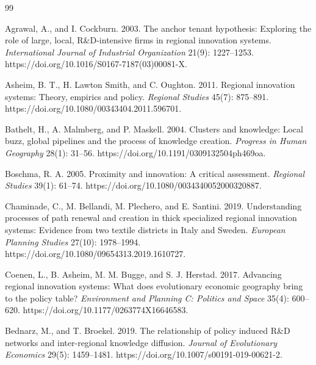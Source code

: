\begin{thebibliography}{99}
\providecommand{\natexlab}[1]{#1}
\providecommand{\url}[1]{\texttt{#1}}
\providecommand{\doi}[1]{https://doi.org/#1}

Agrawal, A., and I. Cockburn. 2003. The anchor tenant hypothesis: Exploring the role of large, local, R\&D-intensive firms in regional innovation systems. \emph{International Journal of Industrial Organization} 21(9): 1227--1253. \doi{10.1016/S0167-7187(03)00081-X}.

Asheim, B. T., H. Lawton Smith, and C. Oughton. 2011. Regional innovation systems: Theory, empirics and policy. \emph{Regional Studies} 45(7): 875--891. \doi{10.1080/00343404.2011.596701}.

Bathelt, H., A. Malmberg, and P. Maskell. 2004. Clusters and knowledge: Local buzz, global pipelines and the process of knowledge creation. \emph{Progress in Human Geography} 28(1): 31--56. \doi{10.1191/0309132504ph469oa}.

Boschma, R. A. 2005. Proximity and innovation: A critical assessment. \emph{Regional Studies} 39(1): 61--74. \doi{10.1080/0034340052000320887}.

Chaminade, C., M. Bellandi, M. Plechero, and E. Santini. 2019. Understanding processes of path renewal and creation in thick specialized regional innovation systems: Evidence from two textile districts in Italy and Sweden. \emph{European Planning Studies} 27(10): 1978--1994. \doi{10.1080/09654313.2019.1610727}.

Coenen, L., B. Asheim, M. M. Bugge, and S. J. Herstad. 2017. Advancing regional innovation systems: What does evolutionary economic geography bring to the policy table? \emph{Environment and Planning C: Politics and Space} 35(4): 600--620. \doi{10.1177/0263774X16646583}.

Bednarz, M., and T. Broekel. 2019. The relationship of policy induced R\&D networks and inter-regional knowledge diffusion. \emph{Journal of Evolutionary Economics} 29(5): 1459--1481. \doi{10.1007/s00191-019-00621-2}.


\end{thebibliography}
